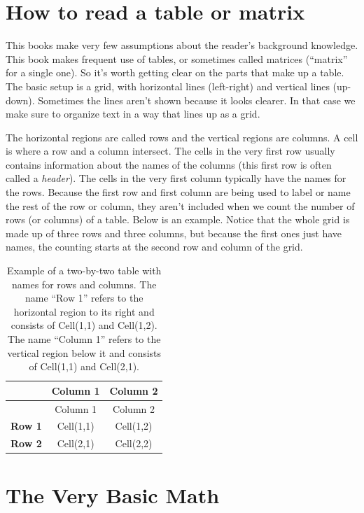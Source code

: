 \documentclass[]{tufte-book}
\begin{document}
\hypertarget{how-to-read-a-table-or-matrix}{%
\section{How to read a table or matrix}\label{how-to-read-a-table-or-matrix}}

This books make very few assumptions about the reader's background knowledge. This book makes frequent use of tables, or sometimes called matrices (``matrix'' for a single one). So it's worth getting clear on the parts that make up a table. The basic setup is a grid, with horizontal lines (left-right) and vertical lines (up-down). Sometimes the lines aren't shown because it looks clearer. In that case we make sure to organize text in a way that lines up as a grid.

The horizontal regions are called rows and the vertical regions are columns. A cell is where a row and a column intersect. The cells in the very first row usually contains information about the names of the columns (this first row is often called a \emph{header}). The cells in the very first column typically have the names for the rows. Because the first row and first column are being used to label or name the rest of the row or column, they aren't included when we count the number of rows (or columns) of a table. Below is an example. Notice that the whole grid is made up of three rows and three columns, but because the first ones just have names, the counting starts at the second row and column of the grid.

\begin{longtable}[]{@{}lcc@{}}
\caption{Example of a two-by-two table with names for rows and columns. The name ``Row 1'' refers to the horizontal region to its right and consists of Cell(1,1) and Cell(1,2). The name ``Column 1'' refers to the vertical region below it and consists of Cell(1,1) and Cell(2,1).}\tabularnewline
\toprule
& Column 1 & Column 2\tabularnewline
\midrule
\endfirsthead
\toprule
& Column 1 & Column 2\tabularnewline
\midrule
\endhead
\textbf{Row 1} & Cell(1,1) & Cell(1,2)\tabularnewline
\textbf{Row 2} & Cell(2,1) & Cell(2,2)\tabularnewline
\bottomrule
\end{longtable}

\hypertarget{the-very-basic-math}{%
\section{The Very Basic Math}\label{the-very-basic-math}}
\end{document}
